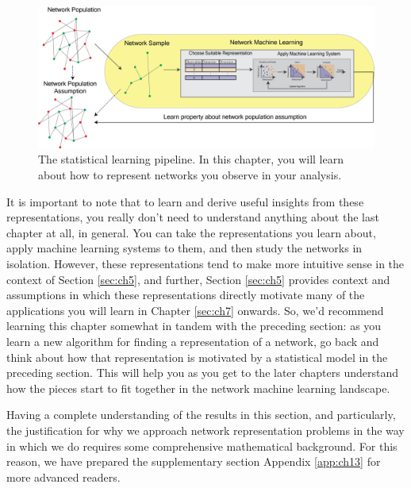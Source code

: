 \begin{figure}[h]
    \centering
    \includegraphics[width=\linewidth]{representations/ch6/Images/network_reps.png}
    \caption[Representation learning schematic]{The statistical learning pipeline. In this chapter, you will learn about how to represent networks you observe in your analysis.}
    \label{fig:ch6:netrep}
\end{figure}

It is important to note that to learn and derive useful insights from these representations, you really don't need to understand anything about the last chapter at {all}, in general. You can take the representations you learn about, apply machine learning systems to them, and then study the networks in isolation. However, these representations tend to make more intuitive sense in the context of Section \ref{sec:ch5}, and further, Section \ref{sec:ch5} provides context and assumptions in which these representations directly motivate many of the applications you will learn in Chapter \ref{sec:ch7} onwards. So, we'd recommend learning this chapter somewhat in tandem with the preceding section: as you learn a new algorithm for finding a representation of a network, go back and think about how that representation is motivated by a statistical model in the preceding section. This will help you as you get to the later chapters understand how the pieces start to fit together in the network machine learning landscape.

Having a complete understanding of the results in this section, and particularly, the justification for {why} we approach network representation problems in the way in which we do requires some comprehensive mathematical background. For this reason, we have prepared the supplementary section Appendix \ref{app:ch13} for more advanced readers.











